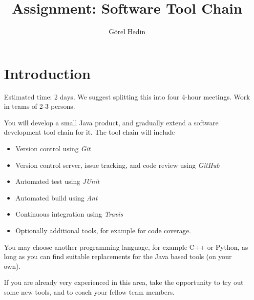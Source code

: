\documentclass[swedish,english]{article}
\author{G{\"o}rel Hedin}
\title{Assignment: Software Tool Chain}
\begin{document}
\maketitle[]

\section*{Introduction}

Estimated time: 2 days. We suggest splitting this into four 4-hour meetings.
Work in teams of 2-3 persons.

You will develop a small Java product, and gradually extend a software development tool chain for it. The tool chain will include
\begin{itemize}
\item Version control using \emph{Git}
\item Version control server, issue tracking, and code review using \emph{GitHub}
\item Automated test using \emph{JUnit}
\item Automated build using \emph{Ant}
\item Continuous integration using \emph{Travis}
\item Optionally additional tools, for example for code coverage.
\end{itemize}
You may choose another programming language, for example C++ or Python, as long as you can find suitable replacements for the Java based tools (on your own).


If you are already very experienced in this area, take the opportunity to try out some new tools, and to coach your fellow team members. 
\end{document}
